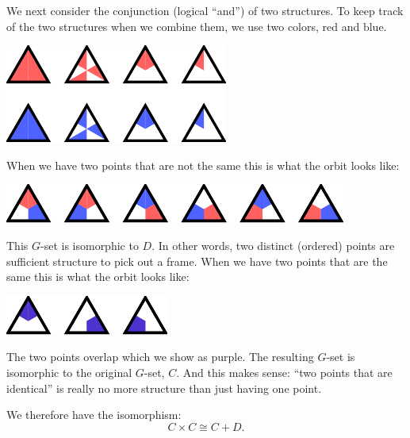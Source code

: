 \documentclass[11pt,oneside]{article}
\begin{document}
We next consider the conjunction (logical ``and'')
of two structures.
To keep track of the two structures when we combine them,
we use two colors, red and blue. 
\begin{center}
\includegraphics[]{pic-triangle-pairs.pdf} 
\end{center}
When we have two points that are not the same
this is what the orbit looks like:
\begin{center}
\includegraphics[]{pic-triangle-point-point-ne.pdf} 
\end{center}
This $G$-set is isomorphic to $D$. In other words,
two distinct (ordered) points are sufficient structure to pick
out a frame.
When we have two points that are the same
this is what the orbit looks like:
\begin{center}
\includegraphics[]{pic-triangle-point-point-eq.pdf} 
\end{center}
The two points overlap which we show as purple. The resulting
$G$-set is isomorphic to the original $G$-set, $C.$
And this makes sense: ``two points that are identical''
is really no more structure than just having one point.

We therefore have the isomorphism:
$$
    C\times C \cong C + D.
$$
\end{document}
